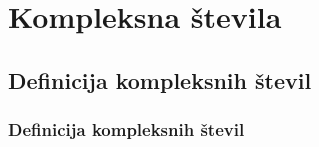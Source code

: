 \section{Kompleksna števila}

\begin{frame}
    \sectionpage
\end{frame}

\begin{frame}
\end{frame}


    \subsection{Definicija kompleksnih števil}

        \begin{frame}
            \frametitle{Definicija kompleksnih števil}
        \end{frame}

        \newpage

